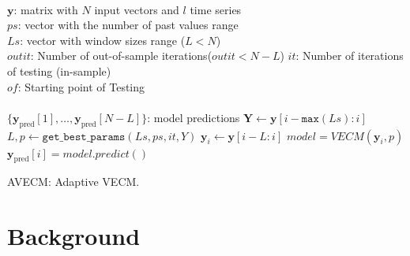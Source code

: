 \begin{algorithm}[ht]
\begin{algorithmic}[1]
\REQUIRE $\,$ \\
$\mathbf{y}$: matrix with $N$ input vectors and $l$ time series\\
$ps$: vector with the number of past values range \\
$Ls$: vector with window sizes range ($L<N$) \\
$outit$: Number of out-of-sample iterations($outit < N-L$)
$it$: Number of iterations of testing (in-sample)\\
$of$: Starting point of Testing \\
\ENSURE  $\,$ \\
$\{ \mathbf{y}_{\text{pred}}[1],\dots,\mathbf{y}_{\text{pred}}[N-L]\}$: model predictions 
   \STATE $\mathbf{Y} \gets \mathbf{y}[i-\texttt{max}(Ls):i]$
    \STATE $L,p \gets
    \texttt{get\_best\_params}(Ls,ps,it,Y)$
    \STATE $\mathbf{y}_i \gets \mathbf{y}[i-L:i]$
        \STATE $model = VECM(\mathbf{y}_i, p)$
        \STATE $\mathbf{y}_{\text{pred}}[i] = model.predict()$
\ENDFOR
\end{algorithmic}
\caption{AVECM: Adaptive VECM.}
\label{alg:AVECM}
\end{algorithm}

\section{Background}
\label{sec:background}

